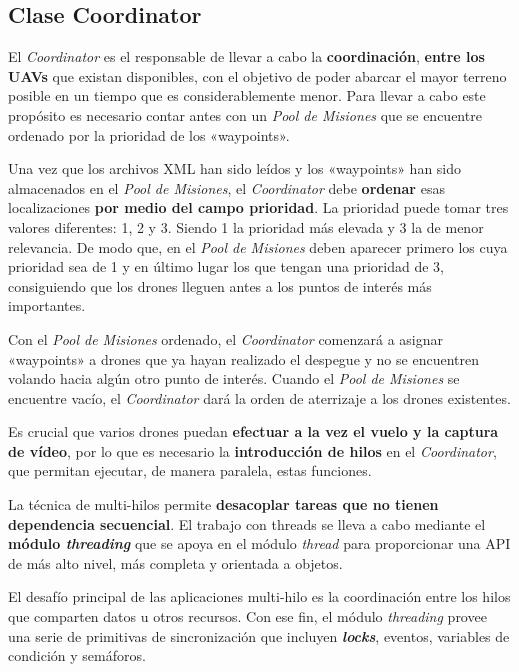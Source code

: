 \subsection{Clase Coordinator}

El \textit{Coordinator} es el responsable de llevar a cabo la \textbf{coordinación}, \textbf{entre los \acs{UAV}s} que existan disponibles, con el objetivo de poder abarcar el mayor terreno posible en un tiempo que es considerablemente menor. Para llevar a cabo este propósito es necesario contar antes con un \textit{Pool de Misiones} que se encuentre ordenado por la prioridad de los «waypoints». 

Una vez que los archivos XML han sido leídos y los «waypoints» han sido almacenados en el \textit{Pool de Misiones}, el \textit{Coordinator} debe \textbf{ordenar} esas localizaciones \textbf{por medio del campo prioridad}. La prioridad puede tomar tres valores diferentes: 1, 2 y 3. Siendo 1 la prioridad más elevada y 3 la de menor relevancia. De modo que, en el \textit{Pool de Misiones} deben aparecer primero los  cuya prioridad sea de 1 y en último lugar los que tengan una prioridad de 3, consiguiendo que los drones lleguen antes a los puntos de interés más importantes.

Con el \textit{Pool de Misiones} ordenado, el \textit{Coordinator} comenzará a asignar «waypoints» a drones que ya hayan realizado el despegue y no se encuentren volando hacia algún otro punto de interés. Cuando el \textit{Pool de Misiones} se encuentre vacío, el \textit{Coordinator} dará la orden de aterrizaje a los drones existentes.

Es crucial que varios drones puedan \textbf{efectuar a la vez el vuelo y la captura de vídeo}, por lo que es necesario la \textbf{introducción de hilos} en el \textit{Coordinator}, que permitan ejecutar, de manera paralela, estas funciones. 

La técnica de multi-hilos permite \textbf{desacoplar tareas que no tienen dependencia secuencial}. El trabajo con threads se lleva a cabo mediante el \textbf{módulo \textit{threading}} que se apoya en el módulo \textit{thread} para proporcionar una \acs{API} de más alto nivel, más completa y orientada a objetos. 

El desafío principal de las aplicaciones multi-hilo es la coordinación entre los hilos que comparten datos u otros recursos. Con ese fin, el módulo \textit{threading} provee una serie de primitivas de sincronización que incluyen \textbf{\textit{locks}}, eventos, variables de condición y semáforos. 

